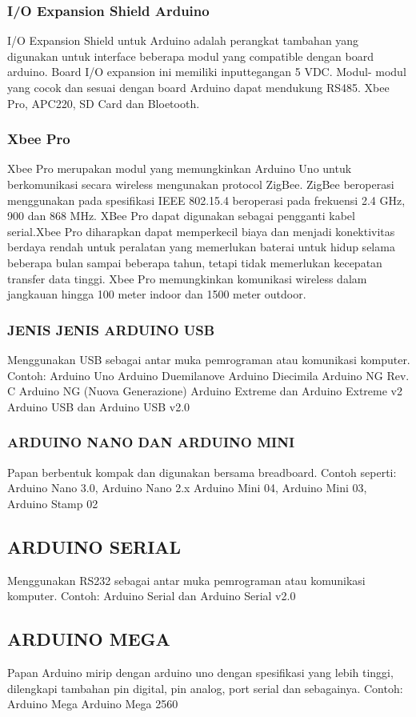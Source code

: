 \subsubsection  {I/O Expansion Shield Arduino}
I/O Expansion Shield untuk Arduino adalah perangkat tambahan yang digunakan untuk interface beberapa modul yang compatible dengan board arduino. Board I/O expansion ini memiliki inputtegangan 5 VDC. Modul- modul yang cocok dan sesuai dengan board Arduino dapat mendukung RS485. Xbee Pro, APC220, SD Card dan Bloetooth.

\subsubsection {Xbee Pro}
 Xbee Pro merupakan modul yang memungkinkan Arduino Uno untuk berkomunikasi secara wireless
mengunakan protocol ZigBee. ZigBee beroperasi menggunakan pada spesifikasi IEEE 802.15.4 beroperasi pada frekuensi
2.4 GHz, 900 dan 868 MHz. XBee Pro dapat digunakan sebagai pengganti kabel serial.Xbee Pro diharapkan dapat memperkecil biaya dan menjadi
konektivitas berdaya rendah untuk peralatan yang memerlukan baterai untuk hidup selama beberapa bulan sampai beberapa tahun, tetapi tidak memerlukan kecepatan transfer data tinggi. Xbee Pro memungkinkan komunikasi wireless dalam jangkauan hingga 100 meter indoor dan 1500 meter outdoor.


\subsubsection {JENIS JENIS ARDUINO USB}
Menggunakan USB sebagai antar muka pemrograman atau komunikasi komputer. Contoh:
Arduino Uno
Arduino Duemilanove
Arduino Diecimila
Arduino NG Rev. C
Arduino NG (Nuova Generazione)
Arduino Extreme dan Arduino Extreme v2
Arduino USB dan Arduino USB v2.0 

\subsubsection {ARDUINO NANO DAN ARDUINO MINI}
Papan berbentuk kompak dan digunakan bersama breadboard. Contoh seperti:
Arduino Nano 3.0, Arduino Nano 2.x
Arduino Mini 04, Arduino Mini 03, Arduino Stamp 02

\subsection {ARDUINO SERIAL}
Menggunakan RS232 sebagai antar muka pemrograman atau komunikasi komputer. Contoh: 
Arduino Serial dan Arduino Serial v2.0  

\subsection {ARDUINO MEGA}
Papan Arduino mirip dengan arduino uno dengan spesifikasi yang lebih tinggi, dilengkapi tambahan pin digital, pin analog, port serial dan sebagainya.  Contoh: 
Arduino Mega  
Arduino Mega 2560  

